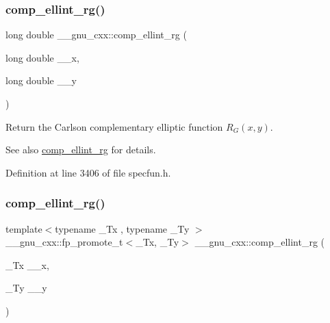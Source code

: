 \subsubsection{\texorpdfstring{comp\+\_\+ellint\+\_\+rg()}{comp\_ellint\_rg()}\hspace{0.1cm}{\footnotesize\ttfamily [2/3]}}
{\footnotesize\ttfamily long double \+\_\+\+\_\+gnu\+\_\+cxx\+::comp\+\_\+ellint\+\_\+rg (\begin{DoxyParamCaption}\item[{long double}]{\+\_\+\+\_\+x,  }\item[{long double}]{\+\_\+\+\_\+y }\end{DoxyParamCaption})\hspace{0.3cm}{\ttfamily [inline]}}

Return the Carlson complementary elliptic function $ R_G(x,y) $.

\begin{DoxySeeAlso}{See also}
\hyperlink{group__gnu__math__spec__func_ga978f8eec6e5edc918b243925dbacb65b}{comp\+\_\+ellint\+\_\+rg} for details. 
\end{DoxySeeAlso}


Definition at line 3406 of file specfun.\+h.

\mbox{\label{group__gnu__math__spec__func_ga389b1ef6cad1e33c1120665a4b915642}} 
\subsubsection{\texorpdfstring{comp\+\_\+ellint\+\_\+rg()}{comp\_ellint\_rg()}\hspace{0.1cm}{\footnotesize\ttfamily [3/3]}}
{\footnotesize\ttfamily template$<$typename \+\_\+\+Tx , typename \+\_\+\+Ty $>$ \\
\+\_\+\+\_\+gnu\+\_\+cxx\+::fp\+\_\+promote\+\_\+t$<$\+\_\+\+Tx, \+\_\+\+Ty$>$ \+\_\+\+\_\+gnu\+\_\+cxx\+::comp\+\_\+ellint\+\_\+rg (\begin{DoxyParamCaption}\item[{\+\_\+\+Tx}]{\+\_\+\+\_\+x,  }\item[{\+\_\+\+Ty}]{\+\_\+\+\_\+y }\end{DoxyParamCaption})\hspace{0.3cm}{\ttfamily [inline]}}

